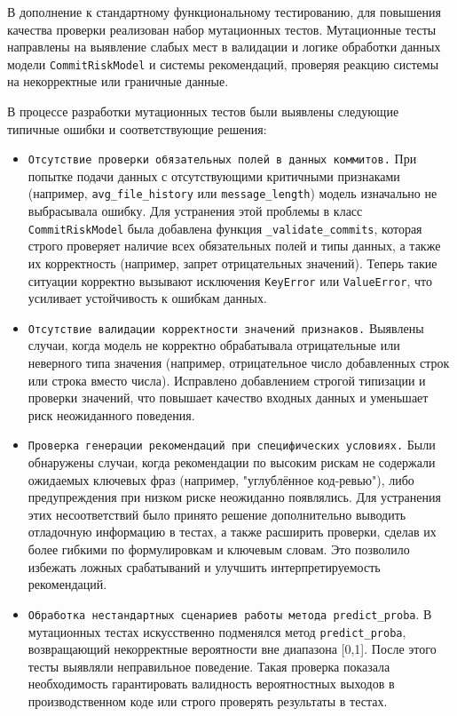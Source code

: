 В дополнение к стандартному функциональному тестированию, для повышения качества проверки реализован набор мутационных тестов. Мутационные тесты направлены на выявление слабых мест в валидации и логике обработки данных модели \texttt{CommitRiskModel} и системы рекомендаций, проверяя реакцию системы на некорректные или граничные данные.

В процессе разработки мутационных тестов были выявлены следующие типичные ошибки и соответствующие решения:

\begin{itemize}
	\item \texttt{Отсутствие проверки обязательных полей в данных коммитов.} При попытке подачи данных с отсутствующими критичными признаками (например, \verb|avg_file_history| или \verb|message_length|) модель изначально не выбрасывала ошибку. Для устранения этой проблемы в класс \texttt{CommitRiskModel} была добавлена функция \verb|_validate_commits|, которая строго проверяет наличие всех обязательных полей и типы данных, а также их корректность (например, запрет отрицательных значений). Теперь такие ситуации корректно вызывают исключения \verb|KeyError| или \verb|ValueError|, что усиливает устойчивость к ошибкам данных.
	\item \texttt{Отсутствие валидации корректности значений признаков.} Выявлены случаи, когда модель не корректно обрабатывала отрицательные или неверного типа значения (например, отрицательное число добавленных строк или строка вместо числа). Исправлено добавлением строгой типизации и проверки значений, что повышает качество входных данных и уменьшает риск неожиданного поведения.
	
	\item \texttt{Проверка генерации рекомендаций при специфических условиях.} Были обнаружены случаи, когда рекомендации по высоким рискам не содержали ожидаемых ключевых фраз (например, "углублённое код-ревью"), либо предупреждения при низком риске неожиданно появлялись. Для устранения этих несоответствий было принято решение дополнительно выводить отладочную информацию в тестах, а также расширить проверки, сделав их более гибкими по формулировкам и ключевым словам. Это позволило избежать ложных срабатываний и улучшить интерпретируемость рекомендаций.
	
	\item \texttt{Обработка нестандартных сценариев работы метода \texttt{predict\_proba}}. В мутационных тестах искусственно подменялся метод \texttt{predict\_proba}, возвращающий некорректные вероятности вне диапазона [0,1]. После этого тесты выявляли неправильное поведение. Такая проверка показала необходимость гарантировать валидность вероятностных выходов в производственном коде или строго проверять результаты в тестах.
	


\end{itemize}
